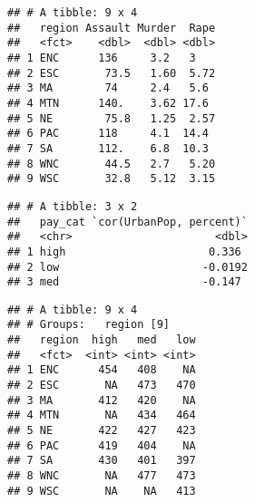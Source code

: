 \documentclass[
]{article}
\newenvironment{Shaded}{\begin{snugshade}}{\end{snugshade}}
\newcommand{\CommentTok}[1]{\textcolor[rgb]{0.56,0.35,0.01}{\textit{#1}}}
\newcommand{\DataTypeTok}[1]{\textcolor[rgb]{0.13,0.29,0.53}{#1}}
\newcommand{\KeywordTok}[1]{\textcolor[rgb]{0.13,0.29,0.53}{\textbf{#1}}}
\newcommand{\NormalTok}[1]{#1}
\newcommand{\OperatorTok}[1]{\textcolor[rgb]{0.81,0.36,0.00}{\textbf{#1}}}
\newcommand{\StringTok}[1]{\textcolor[rgb]{0.31,0.60,0.02}{#1}}
\begin{document}
\begin{Shaded}
\end{Shaded}

\begin{verbatim}
## # A tibble: 9 x 4
##   region Assault Murder  Rape
##   <fct>    <dbl>  <dbl> <dbl>
## 1 ENC      136     3.2   3   
## 2 ESC       73.5   1.60  5.72
## 3 MA        74     2.4   5.6 
## 4 MTN      140.    3.62 17.6 
## 5 NE        75.8   1.25  2.57
## 6 PAC      118     4.1  14.4 
## 7 SA       112.    6.8  10.3 
## 8 WNC       44.5   2.7   5.20
## 9 WSC       32.8   5.12  3.15
\end{verbatim}

\begin{Shaded}
\end{Shaded}

\begin{verbatim}
## # A tibble: 3 x 2
##   pay_cat `cor(UrbanPop, percent)`
##   <chr>                      <dbl>
## 1 high                      0.336 
## 2 low                      -0.0192
## 3 med                      -0.147
\end{verbatim}

\begin{Shaded}
\end{Shaded}

\begin{verbatim}
## # A tibble: 9 x 4
## # Groups:   region [9]
##   region  high   med   low
##   <fct>  <int> <int> <int>
## 1 ENC      454   408    NA
## 2 ESC       NA   473   470
## 3 MA       412   420    NA
## 4 MTN       NA   434   464
## 5 NE       422   427   423
## 6 PAC      419   404    NA
## 7 SA       430   401   397
## 8 WNC       NA   477   473
## 9 WSC       NA    NA   413
\end{verbatim}
\end{document}

